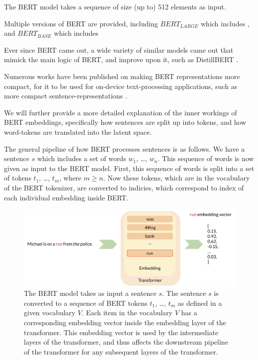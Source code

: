 \documentclass[a4paper,12pt,twoside,openright]{report}
\begin{document}
The BERT model takes a sequence of size (up to) 512 elements as input.


Multiple versions of BERT are provided, including $BERT_{LARGE}$ which includes %
, and $BERT_{BASE}$ which includes %

Ever since BERT came out, a wide variety of similar models came out that mimick the main logic of BERT, and improve upon it, such as DistillBERT \cite{sanh19}.

Numerous works have been published on making BERT representations more compact, for it to be used for on-device text-processing applications, such as more compact sentence-representations \cite{shen19}.



We will further provide a more detailed explanation of the inner workings of BERT embeddings, specifically  how sentences are split up into tokens, and how word-tokens are translated into the latent space.

The general pipeline of how BERT processes sentences is as follows.
We have a sentence $s$ which includes a set of words $w_1$, \ldots, $w_n$.
This sequence of words is now given as input to the BERT model.
First, this sequence of words is split into a set of tokens $t_1$, \ldots, $t_m$, where $m \geq n$.
Now these tokens, which are in the vocabulary of the BERT tokenizer, are converted to indicies, which correspond to index of each individual embedding inside BERT.



\begin{figure}[h]
	\center
  \includegraphics[width=\linewidth]{./assets/experiments/pipeline_vanilla_BERT.png}
  \caption{The BERT model takes as input a sentence $s$. The sentence $s$ is converted to a sequence of BERT tokens $t_1$, \ldots, $t_m$ as defined in a given vocabulary $V$.
Each item in the vocabulary $V$ has a corresponding embedding vector inside the embedding layer of the transformer.
This embedding vector is used by the intermediate layers of the transformer, and thus affects the downstream pipeline of the transformer for any subsequent layers of the transformer.
}
  \label{fig:BERT_vanilla_pipeline}
\end{figure}
\end{document}
